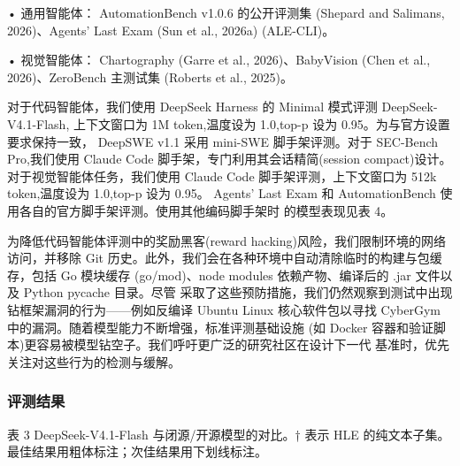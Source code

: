 \documentclass[
  10
]{article}
\begin{document}
• 通用智能体： AutomationBench v1.0.6 的公开评测集 (Shepard and
Salimans, 2026)、Agents' Last Exam (Sun et al., 2026a) (ALE-CLI)。

• 视觉智能体： Chartography (Garre et al., 2026)、BabyVision (Chen et
al., 2026)、ZeroBench 主测试集 (Roberts et al., 2025)。

对于代码智能体，我们使用 DeepSeek Harness 的 Minimal 模式评测 DeepSeek-V4.1-Flash,
上下文窗口为 1M token,温度设为 1.0,top-p 设为 0.95。为与官方设置要求保持一致，
DeepSWE v1.1 采用 mini-SWE 脚手架评测。对于 SEC-Bench Pro,我们使用 Claude Code
脚手架，专门利用其会话精简(session compact)设计。对于视觉智能体任务，我们使用
Claude Code 脚手架评测，上下文窗口为 512k token,温度设为 1.0,top-p 设为 0.95。
Agents' Last Exam 和 AutomationBench 使用各自的官方脚手架评测。使用其他编码脚手架时
的模型表现见表 4。

为降低代码智能体评测中的奖励黑客(reward hacking)风险，我们限制环境的网络访问，并移除
Git 历史。此外，我们会在各种环境中自动清除临时的构建与包缓存，包括 Go 模块缓存
(go/mod)、node modules 依赖产物、编译后的 .jar 文件以及 Python pycache 目录。尽管
采取了这些预防措施，我们仍然观察到测试中出现钻框架漏洞的行为——例如反编译 Ubuntu
Linux 核心软件包以寻找 CyberGym 中的漏洞。随着模型能力不断增强，标准评测基础设施
(如 Docker 容器和验证脚本)更容易被模型钻空子。我们呼吁更广泛的研究社区在设计下一代
基准时，优先关注对这些行为的检测与缓解。



\subsubsection{评测结果}\label{evaluation-results-1}

表 3 \textbar{} DeepSeek-V4.1-Flash 与闭源/开源模型的对比。† 表示 HLE 的纯文本子集。
最佳结果用粗体标注；次佳结果用下划线标注。
\end{document}

